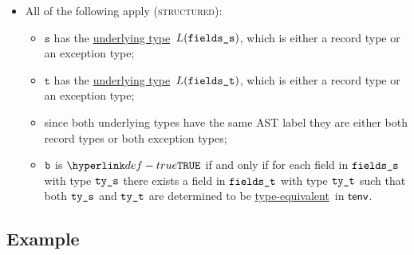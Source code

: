 \documentclass{book}
\newcommand\underlyingtype[0]{\hyperlink{def-underlyingtype}{underlying type}}
\newcommand\typeequivalent[0]{\hyperlink{def-typeequal}{type-equivalent}}
\newcommand\vt[0]{\texttt{t}}
\newcommand\vs[0]{\texttt{s}}
\begin{document}
\begin{itemize}
\item All of the following apply (\textsc{structured}):
  \begin{itemize}
  \item $\vs$ has the \underlyingtype\ $L(\texttt{fields\_s})$, which is either a record type or an exception type;
  \item $\vt$ has the \underlyingtype\ $L(\texttt{fields\_t})$, which is either a record type or an exception type;
  \item since both underlying types have the same AST label they are either both record types or both exception types;
  \item $\texttt{b}$ is $\True$ if and only if for each field in $\texttt{fields\_s}$ with type $\texttt{ty\_s}$
  there exists a field in $\texttt{fields\_t}$ with type $\texttt{ty\_t}$ such that both $\texttt{ty\_s}$ and $\texttt{ty\_t}$
  are determined to be \typeequivalent\ in $\textsf{tenv}$.
  \end{itemize}
\end{itemize}

\subsection{Example}

\end{document}
